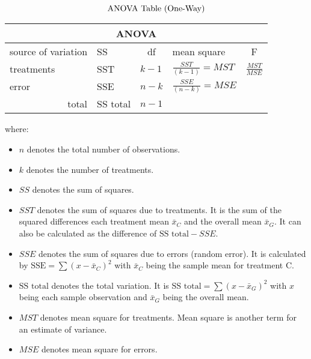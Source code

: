 \hformbar


 \\
\begin{equation}
\label{anova table one-way}
\centering \text{ANOVA Table (One-Way)}
\end{equation}
\begin{table}[!h] %
 \begin{footnotesize} %
 \begin{tabular}{@{}lllll@{}}
 \toprule
 \multicolumn{5}{c}{ANOVA} \\
 \midrule
 source of variation & \multicolumn{1}{l}{SS} & \multicolumn{1}{c}{df} & \multicolumn{1}{l}{mean square} & \multicolumn{1}{c}{F} \\
 \midrule
 treatments & SST & $k-1$ & $\frac{SST}{(k-1)}=MST$ & $\frac{MST}{MSE}$ \\
 error & SSE & $n-k$ & $\frac{SSE}{(n - k)} = MSE$ &  \\
 \multicolumn{1}{r}{total} & SS total  & $n - 1$ &  & 
 \end{tabular}
 \end{footnotesize}
\end{table}
where:
\begin{itemize}
 \item $n$ denotes the total number of observations.
 \item $k$ denotes the number of treatments.
 \item $SS$ denotes the sum of squares.
 \item $SST$ denotes the sum of squares due to treatments. It is the sum of the squared differences each treatment mean $\bar{x}_C$ and the overall mean $\bar{x}_G$. It can also be calculated as the difference of $\text{SS total} - SSE$. 
 \item $SSE$ denotes the sum of squares due to errors (random error). It is calculated by $\text{SSE} = \sum{(x-\bar{x}_C)^2}$ with $\bar{x}_C$ being the sample mean for treatment C.
 \item $\text{SS total}$ denotes the total variation. It is $\text{SS total} = \sum{(x-\bar{x}_{G})^{2}}$ with $x$ being each sample observation and $\bar{x}_G$ being the overall mean.
 \item $MST$ denotes mean square for treatments. Mean square is another term for an estimate of variance.
 \item $MSE$ denotes mean square for errors.
\end{itemize}
\hformbar


